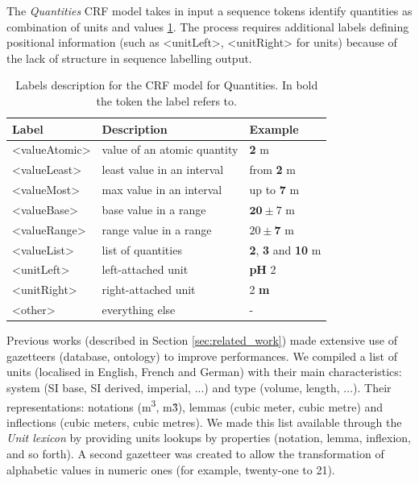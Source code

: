 \documentclass[sigplan, anonymous, review]{acmart}
\begin{document}
The \textit{Quantities} CRF model takes in input a sequence tokens identify quantities as combination of units and values \ref{tab:quantities-model-labels}. The process requires additional labels defining positional information (such as <unitLeft>, <unitRight> for units) because of the lack of structure in sequence labelling output. 

\begin{table}[ht]
  \caption{Labels description for the CRF model for Quantities. In bold the token the label refers to.}
  \label{tab:quantities-model-labels}
  \begin{tabular}{lll}
    \toprule
    Label & Description & Example\\
    \midrule
    <valueAtomic> & value of an atomic quantity & \textbf{2} m \\
    <valueLeast> & least value in an interval & from \textbf{2} m \\
    <valueMost> & max value in an interval & up to \textbf{7} m \\
    <valueBase> & base value in a range & $\textbf{20}\pm7$ m \\
    <valueRange> & range value in a range & $20 \pm \textbf{7}$ m \\
    <valueList> & list of quantities & \textbf{2}, \textbf{3} and \textbf{10} m \\
    <unitLeft> & left-attached unit & \textbf{pH} 2 \\
    <unitRight> & right-attached unit & 2 \textbf{m} \\
    <other> & everything else & - \\
  \bottomrule
\end{tabular}
\end{table}

Previous works (described in Section \ref{sec:related_work}) made extensive use of gazetteers (database, ontology) to improve performances. We compiled a list of units (localised in English, French and German) with their main characteristics: system (SI base, SI derived, imperial, ...) and type (volume, length, ...). Their representations: notations (m\textsuperscript{3}, m\^3), lemmas (cubic meter, cubic metre) and inflections (cubic meters, cubic metres).  We made this list available through the \textit{Unit lexicon} by providing units lookups by properties (notation, lemma, inflexion, and so forth). A second gazetteer was created to allow the transformation of alphabetic values in numeric ones (for example, twenty-one to 21).
\end{document}
